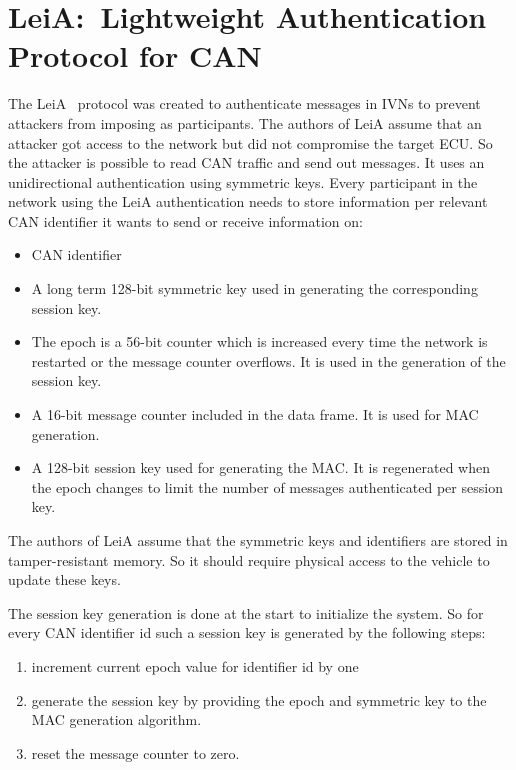 


\section{LeiA:\ Lightweight Authentication Protocol for CAN}\label{sec:leia}

The LeiA~\cite{Radu2016} protocol was created to authenticate messages in IVNs
to prevent attackers from imposing as participants. The authors of LeiA assume
that an attacker got access to the network but did not compromise the target
ECU\@. So the attacker is possible to read CAN traffic and send out messages. It
uses an unidirectional authentication using symmetric keys. Every participant in
the network using the LeiA authentication needs to store information per
relevant CAN identifier it wants to send or receive information on:

\begin{itemize}
    \item CAN identifier
    \item A long term 128-bit symmetric key used in generating the corresponding
    session key.
    \item The epoch is a 56-bit counter which is increased every time the
    network is restarted or the message counter overflows. It is used in the
    generation of the session key.
    \item A 16-bit message counter included in the data frame. It is used for
    MAC generation.
    \item A 128-bit session key used for generating the MAC\@. It is regenerated
    when the epoch changes to limit the number of messages authenticated per
    session key.
\end{itemize}

The authors of LeiA assume that the symmetric keys and identifiers are stored in
tamper-resistant memory. So it should require physical access to the vehicle to
update these keys.

The session key generation is done at the start to initialize the system. So for
every CAN identifier id such a session key is generated by the following steps:

\begin{enumerate}
    \item increment current epoch value for identifier id by one
    \item generate the session key by providing the epoch and symmetric key to
    the MAC generation algorithm.
    \item reset the message counter to zero.
\end{enumerate}

